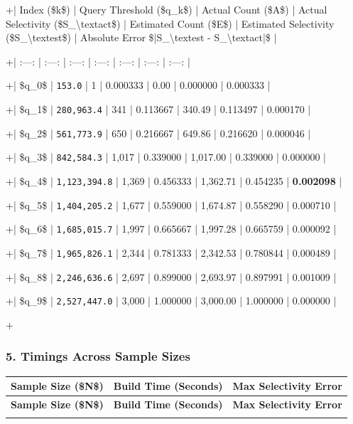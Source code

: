 \documentclass[11pt,a4paper]{article}
\begin{document}
{{{+| Index (\$k\$) | Query Threshold (\$q\_k\$) | Actual Count (\$A\$) | Actual Selectivity (\$S\_{\textbackslash{}text{act}}\$) | Estimated Count (\$E\$) | Estimated Selectivity (\$S\_{\textbackslash{}text{est}}\$) | Absolute Error \$|S\_{\textbackslash{}text{est}} - S\_{\textbackslash{}text{act}}|\$ |

+| :---: | :---: | :---: | :---: | :---: | :---: | :---: |

+| \$q\_0\$ | \texttt{153.0} | 1 | 0.000333 | 0.00 | 0.000000 | 0.000333 |

+| \$q\_1\$ | \texttt{280,963.4} | 341 | 0.113667 | 340.49 | 0.113497 | 0.000170 |

+| \$q\_2\$ | \texttt{561,773.9} | 650 | 0.216667 | 649.86 | 0.216620 | 0.000046 |

+| \$q\_3\$ | \texttt{842,584.3} | 1,017 | 0.339000 | 1,017.00 | 0.339000 | 0.000000 |

+| \$q\_4\$ | \texttt{1,123,394.8} | 1,369 | 0.456333 | 1,362.71 | 0.454235 | \textbf{0.002098} |

+| \$q\_5\$ | \texttt{1,404,205.2} | 1,677 | 0.559000 | 1,674.87 | 0.558290 | 0.000710 |

+| \$q\_6\$ | \texttt{1,685,015.7} | 1,997 | 0.665667 | 1,997.28 | 0.665759 | 0.000092 |

+| \$q\_7\$ | \texttt{1,965,826.1} | 2,344 | 0.781333 | 2,342.53 | 0.780844 | 0.000489 |

+| \$q\_8\$ | \texttt{2,246,636.6} | 2,697 | 0.899000 | 2,693.97 | 0.897991 | 0.001009 |

+| \$q\_9\$ | \texttt{2,527,447.0} | 3,000 | 1.000000 | 3,000.00 | 1.000000 | 0.000000 |

+


\subsubsection{5. Timings Across Sample Sizes}
{\begingroup
\small
\setlength{\tabcolsep}{5pt}
\begin{xltabular}{\textwidth}{l | C | C}
\toprule
\textbf{Sample Size (\$N\$)} & \textbf{Build Time (Seconds)} & \textbf{Max Selectivity Error} \\
\midrule
\endfirsthead
\toprule
\textbf{Sample Size (\$N\$)} & \textbf{Build Time (Seconds)} & \textbf{Max Selectivity Error} \\
\midrule
\endfirsthead
\endhead
\bottomrule
\endfoot
\bottomrule
\endlastfoot
\end{xltabular}
\endgroup}

}}}
\end{document}
